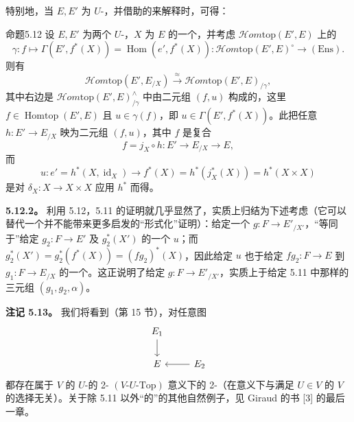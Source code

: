 特别地，当 $E,E'$ 为 $U$-，并借助的来解释时，可得：
\begin{SGAresult}{命题}{5.12}
设 $E,E'$ 为两个 $U$-，$X$ 为 $E$ 的一个，并考虑 $\mathscr{H}om\mathrm{top}(E',E)$ 上的
\[\gamma:f\longmapsto\Gamma(E',f^*(X))=\operatorname{Hom}(e',f^*(X)):\mathscr{H}om\mathrm{top}(E',E)^\circ\longrightarrow(\mathrm{Ens}).\]
则有
\[\mathscr{H}om\mathrm{top}(E',E_{/X})\xrightarrow{\approx}\mathscr{H}om\mathrm{top}(E',E)_{/\gamma},\tag{5.12.1}\]
其中右边是 $\mathscr{H}om\mathrm{top}(E',E)^{\wedge}_{/\gamma}$ 中由二元组 $(f,u)$ 构成的，这里 $f\in\operatorname{Homtop}(E',E)$ 且 $u\in\gamma(f)$，即 $u\in\Gamma(E',f^*(X))$。此把任意 $h:E'\to E_{/X}$ 映为二元组 $(f,u)$，其中 $f$ 是复合
\[f=j_X\circ h:E'\longrightarrow E_{/X}\longrightarrow E,\]
而
\[u:e'=h^*(X,\operatorname{id}_X)\longrightarrow f^*(X)=h^*(j_X^*(X))=h^*(X\times X)\]
是对 $\delta_X:X\to X\times X$ 应用 $h^*$ 而得。
\end{SGAresult}

\textbf{5.12.2。} 利用 5.12，5.11 的证明就几乎显然了，实质上归结为下述考虑（它可以替代一个并不能带来更多启发的“形式化”证明）：给定一个 $g:F\to E'_{/X'}$，“等同于”给定 $g_2:F\to E'$ 及 $g_2^*(X')$ 的一个 $u$；而 $g_2^*(X')=g_2^*(f^*(X))=(fg_2)^*(X)$，因此给定 $u$ 也于给定 $fg_2:F\to E$ 到 $g_1:F\to E_{/X}$ 的一个。这正说明了给定 $g:F\to E'_{/X'}$，实质上于给定 5.11 中那样的三元组 $(g_1,g_2,\alpha)$。

\textbf{注记 5.13。} 我们将看到（第 15 节），对任意图
\[\begin{tikzcd}E_1\arrow[d]\\E&E_2\arrow[l]\end{tikzcd}\]
都存在属于 $V$ 的 $U$-的 2- $(V\text{-}U\text{-}\mathrm{Top})$ 意义下的 2-（在意义下与满足 $U\in V$ 的 $V$ 的选择无关）。关于除 5.11 以外“的”的其他自然例子，见 Giraud 的书 [3] 的最后一章。

